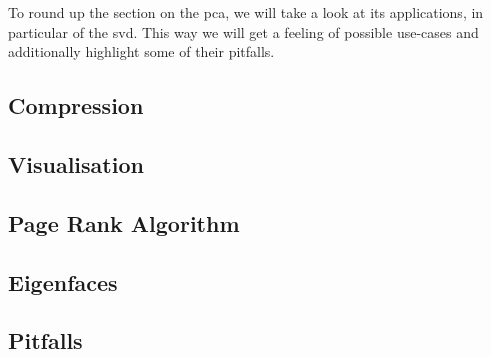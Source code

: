 To round up the section on the \acrlong{pca}, we will take a look at its applications, in particular of the \acrlong{svd}.
This way we will get a feeling of possible use-cases and additionally highlight some of their pitfalls.


\subsection{Compression}

\clearpage

\subsection{Visualisation}

\clearpage

\subsection{Page Rank Algorithm}

\clearpage

\subsection{Eigenfaces} \label{sec:eigenfaces}

\clearpage

\subsection{Pitfalls}

\clearpage
